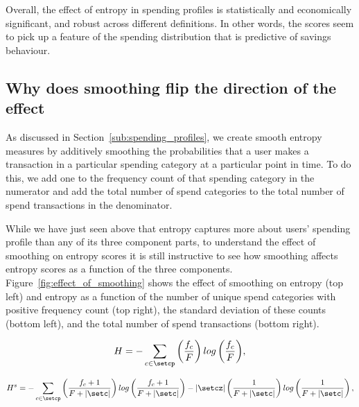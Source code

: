 Overall, the effect of entropy in spending profiles is statistically and
economically significant, and robust across different definitions. In other
words, the scores seem to pick up a feature of the spending distribution that
is predictive of savings behaviour.



\subsection{Why does smoothing flip the direction of the effect}%
\label{sub:why_does_smoothing_flip_the_direction_of_the_effect}

As discussed in Section~\ref{sub:spending_profiles}, we create smooth entropy
measures by additively smoothing the probabilities that a user makes a
transaction in a particular spending category at a particular point in time. To
do this, we add one to the frequency count of that spending category in the
numerator and add the total number of spend categories to the total number of
spend transactions in the denominator.

While we have just seen above that entropy captures more about users' spending
profile than any of its three component parts, to understand the effect of
smoothing on entropy scores it is still instructive to see how smoothing
affects entropy scores as a function of the three components.
Figure~\ref{fig:effect_of_smoothing} shows the effect of smoothing on entropy
(top left) and entropy as a function of the number of unique spend categories
with positive frequency count (top right), the standard deviation of these
counts (bottom left), and the total number of spend transactions (bottom
right).

\newpage

\begin{equation}
\label{equ:entropy_us}
H = -\sum_{c \in \setcp}{\left(\frac{f_c}{F}\right)
log\left(\frac{f_c}{F}\right)},
\end{equation}

\begin{equation}
\label{equ:entropy_s}
H^s = -\sum_{c \in \setcp}{\left(\frac{f_c + 1}{F + |\setc|}\right)
log\left(\frac{f_c + 1}{F + |\setc|}\right)}
- |\setcz|\left(\frac{1}{F + |\setc|}\right)
log\left(\frac{1}{F + |\setc|}\right),
\end{equation}

